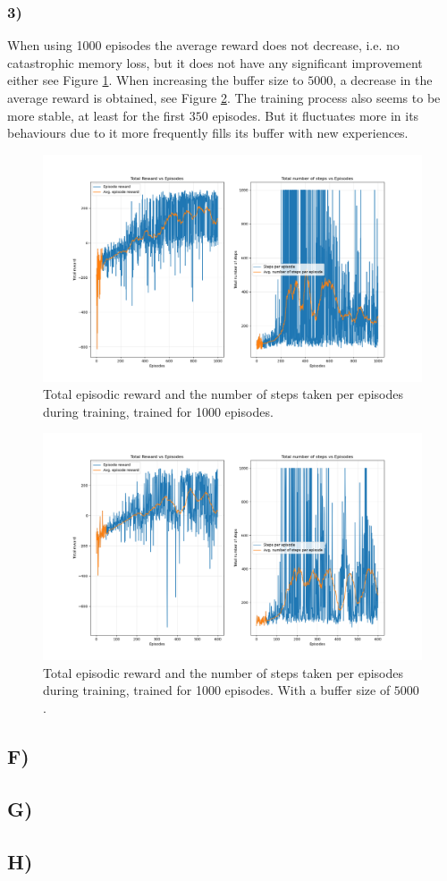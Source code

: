 \documentclass{article}
\begin{document}
\subsubsection*{3)}
When using 1000 episodes the average reward does not decrease, i.e. no catastrophic memory loss, but it does not have any significant improvement either see Figure \ref{fig:episodes1000}. When increasing the buffer size to $5000$, a decrease in the average reward is obtained, see Figure \ref{fig:buffer5000}. The training process also seems to be more stable, at least for the first $350$ episodes. But it fluctuates more in its behaviours due to it more frequently fills its buffer with new experiences.  
\begin{figure}[H]
    \centering
    \includegraphics[width=1\textwidth]{Lab_2/problem1/images/episodes1000.png}
    \caption{\small Total episodic reward and the number of steps taken per episodes during training, trained for 1000 episodes. }
    \label{fig:episodes1000}
\end{figure}


\begin{figure}[H]
    \centering
    \includegraphics[width=1\textwidth]{Lab_2/problem1/images/buffer5000.png}
    \caption{\small Total episodic reward and the number of steps taken per episodes during training, trained for 1000 episodes. With a buffer size of $5000$. }
    \label{fig:buffer5000}
\end{figure}


\subsection*{F)}

\subsection*{G)}

\subsection*{H)}
\end{document}
